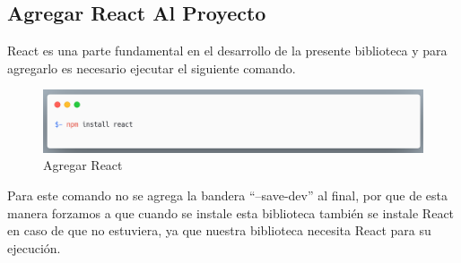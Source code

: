     
    \subsection{Agregar React Al Proyecto}
    React es una parte fundamental en el desarrollo de la presente biblioteca y para agregarlo es necesario ejecutar el siguiente comando.
    \newline
    \newline
     \begin{figure}[H]
    \includegraphics[width=1\textwidth]{./Imagenes/image23.png}
    \caption[Agregar React]{Agregar React}
    \end{figure}
    \newline
    \newline
    Para este comando no se agrega la bandera “–save-dev” al final, por que de esta manera forzamos a que cuando se instale esta biblioteca también se instale React en caso de que no estuviera, ya que nuestra biblioteca necesita React para su ejecución.
    
    
